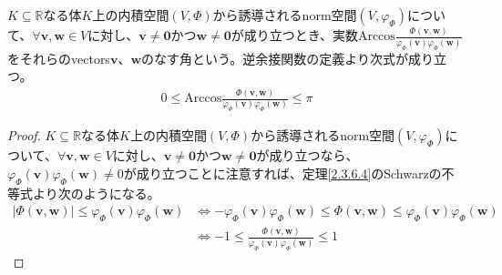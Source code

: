 \documentclass[dvipdfmx]{jsarticle}
\begin{document}
\begin{dfn}
$K \subseteq \mathbb{R}$なる体$K$上の内積空間$(V,\varPhi)$から誘導されるnorm空間$\left( V,\varphi_{\varPhi} \right)$について、$\forall\mathbf{v},\mathbf{w} \in V$に対し、$\mathbf{v} \neq \mathbf{0}$かつ$\mathbf{w} \neq \mathbf{0}$が成り立つとき、実数$\mathrm{Arccos}\frac{\varPhi\left( \mathbf{v},\mathbf{w} \right)}{\varphi_{\varPhi}\left( \mathbf{v} \right)\varphi_{\varPhi}\left( \mathbf{w} \right)}$をそれらのvectors$\mathbf{v}$、$\mathbf{w}$のなす角という。逆余接関数の定義より次式が成り立つ。
\begin{align*}
0 \leq \mathrm{Arccos}\frac{\varPhi\left( \mathbf{v},\mathbf{w} \right)}{\varphi_{\varPhi}\left( \mathbf{v} \right)\varphi_{\varPhi}\left( \mathbf{w} \right)} \leq \pi
\end{align*}
\end{dfn}
\begin{proof}
$K \subseteq \mathbb{R}$なる体$K$上の内積空間$(V,\varPhi)$から誘導されるnorm空間$\left( V,\varphi_{\varPhi} \right)$について、$\forall\mathbf{v},\mathbf{w} \in V$に対し、$\mathbf{v} \neq \mathbf{0}$かつ$\mathbf{w} \neq \mathbf{0}$が成り立つなら、$\varphi_{\varPhi}\left( \mathbf{v} \right)\varphi_{\varPhi}\left( \mathbf{w} \right) \neq 0$が成り立つことに注意すれば、定理\ref{2.3.6.4}のSchwarzの不等式より次のようになる。
\begin{align*}
\left| \varPhi\left( \mathbf{v},\mathbf{w} \right) \right| \leq \varphi_{\varPhi}\left( \mathbf{v} \right)\varphi_{\varPhi}\left( \mathbf{w} \right) &\Leftrightarrow - \varphi_{\varPhi}\left( \mathbf{v} \right)\varphi_{\varPhi}\left( \mathbf{w} \right) \leq \varPhi\left( \mathbf{v},\mathbf{w} \right) \leq \varphi_{\varPhi}\left( \mathbf{v} \right)\varphi_{\varPhi}\left( \mathbf{w} \right)\\
&\Leftrightarrow - 1 \leq \frac{\varPhi\left( \mathbf{v},\mathbf{w} \right)}{\varphi_{\varPhi}\left( \mathbf{v} \right)\varphi_{\varPhi}\left( \mathbf{w} \right)} \leq 1
\end{align*}
\end{proof}
\end{document}
